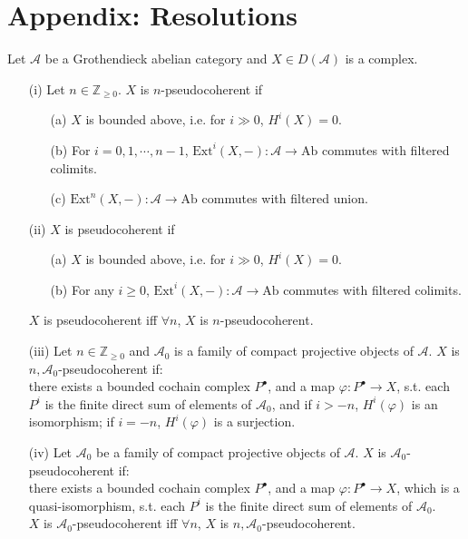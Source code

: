 \documentclass[UTF8,12,a4paper]{ctexart}
\theoremstyle{definition}
\begin{document}
\newpage
\section*{Appendix: Resolutions}
\dfn 
Let $\mathcal{A}$ be a Grothendieck abelian category and  $X\in D(\mathcal{A})$ is a complex.
\begin{itemize}
	\item [(i)]
	Let $n\in\mathbb{Z}_{\geq 0}$. $X$ is $n$-pseudocoherent if
	\begin{itemize}
		\item [(a)] $X$ is bounded above, i.e. for $i\gg 0$, $H^i(X)=0.$
		\item [(b)]For $i=0,1,\cdots,n-1$, $\text{Ext}^i(X,-):\mathcal{A}\rightarrow \text{Ab}$ commutes with filtered colimits.
		\item [(c)] $\text{Ext}^n(X,-):\mathcal{A}\rightarrow \text{Ab}$ commutes with filtered union.
	\end{itemize}
\item [(ii)]
$X$ is pseudocoherent if
\begin{itemize}
	\item [(a)] $X$ is bounded above, i.e. for $i\gg 0$, $H^i(X)=0.$
	\item [(b)] For any $i\geq 0$, $\text{Ext}^i(X,-):\mathcal{A}\rightarrow \text{Ab}$ commutes with filtered colimits.
\end{itemize}
$X$ is pseudocoherent iff $\forall n$, $X$ is $n$-pseudocoherent.
\item [(iii)]
Let $n\in\mathbb{Z}_{\geq 0}$ and $\mathcal{A}_0$ is a family of compact projective objects of $\mathcal{A}$. $X$ is $n, \mathcal{A}_0$-pseudocoherent if:\\
there exists a bounded cochain complex $P^\bullet$, and a map $\varphi:P^\bullet\rightarrow X$, s.t. each $P^i$ is the finite direct sum of elements of $\mathcal{A}_0$, and if $i>-n$, $H^i(\varphi)$ is an isomorphism; if $i=-n$, $H^i(\varphi)$ is a surjection.
\item [(iv)]
Let $\mathcal{A}_0$ be a family of compact projective objects of $\mathcal{A}$. $X$ is $\mathcal{A}_0$-pseudocoherent if:\\
there exists a bounded cochain complex $P^\bullet$, and a map $\varphi:P^\bullet\rightarrow X$, which is a quasi-isomorphism, s.t. each $P^i$ is the finite direct sum of elements of $\mathcal{A}_0$.
~\\
$X$ is $\mathcal{A}_0$-pseudocoherent iff $\forall n$, $X$ is $n,\mathcal{A}_0$-pseudocoherent.
\end{itemize}
\end{document}
